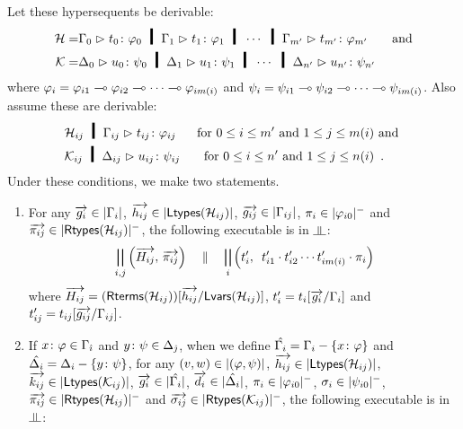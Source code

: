 \begin{proposition}[Adequacy]
 Let these hypersequents be derivable:
 \begin{align*}
  \Hy = &\sequent{\G_0}{\tj{t_0}{\phi_0}} \hmid
  \sequent{\G_1}{\tj{t_1}{\phi_1}} \hmid \cdots \hmid
  \sequent{\G_{m'}}{\tj{t_{m'}}{\phi_{m'}}}
  &\text{ and}\\
  \Ky = &\sequent{\D_0}{\tj{u_0}{\psi_0}} \hmid
  \sequent{\D_1}{\tj{u_1}{\psi_1}} \hmid \cdots \hmid
  \sequent{\D_{n'}}{\tj{u_{n'}}{\psi_{n'}}}
 \end{align*}
where $\varphi_i = {\varphi_{i1}\multimap\varphi_{i2}\multimap\cdots\multimap\varphi_{im(i)}}$
and   $\psi_i = {\psi_{i1}\multimap\psi_{i2}\multimap\cdots\multimap\psi_{im(i)}}$.
 Also assume these are derivable:
 \begin{align*}
  & \Hy_{ij} \hmid \sequent{\G_{ij}}{\tj{t_{ij}}{\phi_{ij}}} &\text{ for
  } 0\le i\le m'\text{ and }1\le j\le m(i) &\text{ and }\\
  & \Ky_{ij} \hmid \sequent{\D_{ij}}{\tj{u_{ij}}{\psi_{ij}}} &\text{ for
  } 0\le i\le n'\text{ and }1\le j\le n(i)&\enspace .
 \end{align*}
 Under these conditions, we make two statements.
 \begin{enumerate}[label=(\arabic{*}), ref=\textit{(\arabic{*})}]
  \item \label{c:first}
	For any
	$\overrightarrow{g_i}         \in|{\Gamma_i}|$,
	$\overrightarrow{h_{ij}}      \in|{\mathsf{Ltypes}({\mathcal{H}_{ij}})}|$,
	$\overrightarrow{g_{ij}}      \in|{\Gamma_{ij}}|$,
	$\pi_i             \in|{\varphi_{i0}}|^-$ and
	$\overrightarrow{\pi_{ij}}    \in|{\mathsf{Rtypes}({\mathcal{H}_{ij}})}|^-$,
	the following executable is in $\bbot$:
	\[
	 \bigparallel_{i,j}\left(\overrightarrow{H_{ij}},\,
	\overrightarrow{\pi_{ij}}\right)\quad \parallel\quad
	\bigparallel_i\left(t_i',\,\,\,t'_{i1}\cdot t'_{i2}\cdots
	t'_{im(i)}\cdot \pi_i\right)
	\]
	where $
	 \overrightarrow{H_{ij}}=(\mathsf{Rterms}({\mathcal{H}_{ij}}))[\overrightarrow{h_{ij}}/\mathsf{Lvars}({\mathcal{H}_{ij}})]$,\quad
	$t'_i = t_i[\overrightarrow{g_i}/\Gamma_i]$ and\quad
	$t'_{ij} = t_{ij}[\overrightarrow{g_{ij}}/\Gamma_{ij}]$\enspace.
  \item \label{c:second}
	If ${x} \colon{\varphi}\in\Gamma_{\hat\imath}$ and
	${y} \colon{\psi}\in\Delta_{\hat\jmath}$,
	when we define $\hat{\Gamma_i} = \Gamma_i -\{{x} \colon{\varphi}\}$ and
	$\hat{\Delta_i} = \Delta_i -\{{y} \colon{\psi}\}$,
	for any $(v,w)\in|{(\varphi,\psi)}|$,
	$\overrightarrow{h_{ij}}\in|{\mathsf{Ltypes}({\mathcal{H}_{ij}})}|$,
	$\overrightarrow{k_{ij}}\in|{\mathsf{Ltypes}({\mathcal{K}_{ij}})}|$,
	$\overrightarrow{g_i}\in|{\hat{\Gamma_i}}|$,
	$\overrightarrow{d_i}\in|{\hat{\Delta_i}}|$,
	$\pi_i\in|{\varphi_{i0}}|^-$,
	$\sigma_i\in|{\psi_{i0}}|^-$,
	$\overrightarrow{\pi_{ij}}\in|{\mathsf{Rtypes}({\mathcal{H}_{ij}})}|^-$ and
	$\overrightarrow{\sigma_{ij}}\in|{\mathsf{Rtypes}({\mathcal{K}_{ij}})}|^-$,
	the following executable is in $\bbot$:

\end{enumerate}
\end{proposition}
